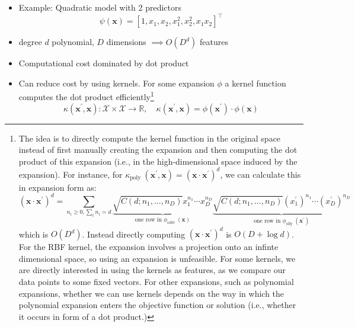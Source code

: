 \documentclass[11pt, %
	oneside, %
	english, %
	onehalfspacing, %
	parskip, %
	]{article} %
\theoremstyle{definition}
\begin{document}
\begin{itemize}
	\item Example: Quadratic model with 2 predictors
	\begin{equation*}
		\psi(\mathbf{x})=\left[1, x_1, x_2, x_1^2, x_2^2, x_1 x_2\right]^{\top}
	\end{equation*}
	\item degree $d$ polynomial, $D$ dimensions $\implies O(D^d)$ features
	\item Computational cost dominated by dot product
	\item Can reduce cost by using kernels. For some expansion $\phi$ a kernel function computes the dot product efficiently\footnote{The idea is to directly compute the kernel function in the original space instead of first manually creating the expansion and then computing the dot product of this expansion (i.e., in the high-dimensional space induced by the expansion). For instance, for $\kappa_{\text {poly }}\left(\mathbf{x}^{\prime}, \mathbf{x}\right)=\left(\mathbf{x} \cdot \mathbf{x}^{\prime}\right)^d$, we can calculate this in expansion form as:
	\begin{equation*}
		\left(\mathbf{x} \cdot \mathbf{x}^{\prime}\right)^d=\sum_{n_i \geq 0, \sum_i n_i=d} \underbrace{\sqrt{C\left(d ; n_1, \ldots, n_D\right)} x_1^{n_1} \cdots x_D^{n_D}}_{\text {one row in } \phi_{\text {odlv }}(\mathbf{x})} \underbrace{\sqrt{C\left(d ; n_1, \ldots, n_D\right)}\left(x_1^{\prime}\right)^{n_1} \cdots\left(x_D^{\prime}\right)^{n_D}}_{\text {one row in } \phi_{\text {olly }}\left(\mathbf{x}^{\prime}\right)}
	\end{equation*}
	which is $O(D^d)$. Instead directly computing $\left(\mathbf{x} \cdot \mathbf{x}^{\prime}\right)^d$ is $O(D + \log d)$. For the RBF kernel, the expansion involves a projection onto an infinte dimensional space, so using an expansion is unfeasible. For some kernels, we are directly interested in using the kernels as features, as we compare our data points to some fixed vectors. For other expansions, such as polynomial expansions, whether we can use kernels depends on the way in which the polynomial expansion enters the objective function or solution (i.e., whether it occurs in form of a dot product.)
	 }
	\begin{equation*}
		\kappa\left(\mathbf{x}^{\prime}, \mathbf{x}\right): \mathcal{X} \times \mathcal{X} \rightarrow \mathbb{R}, \quad \kappa\left(\mathbf{x}^{\prime}, \mathbf{x}\right)=\phi\left(\mathbf{x}^{\prime}\right) \cdot \phi(\mathbf{x})
	\end{equation*}

\end{itemize}
\end{document}

